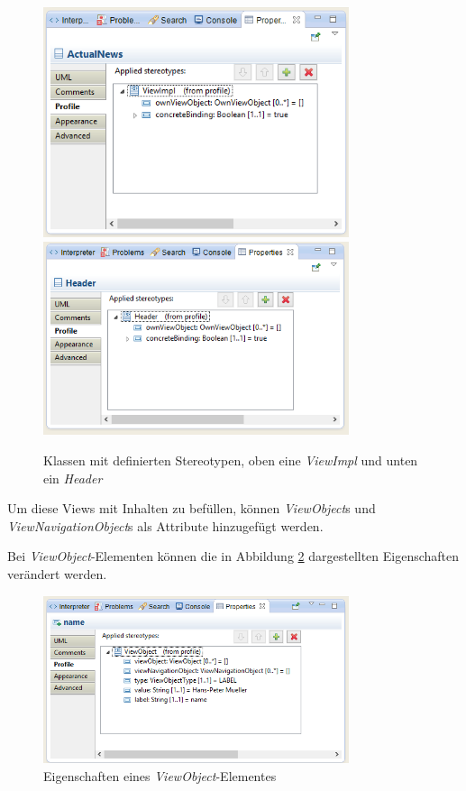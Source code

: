 \newpage
\begin{figure}[htbp]
\begin{center}
\includegraphics[width=0.8\textwidth]{./img/Prop-ViewImp.png}
\includegraphics[width=0.8\textwidth]{./img/Prop-Header.png}
\caption{Klassen mit definierten Stereotypen, oben
eine \textit{ViewImpl} und unten ein \textit{Header}}\label{Fig:SideProp}
\end{center}
\end{figure} 

Um diese Views mit Inhalten zu befüllen, können \textit{ViewObject}s und 
\textit{ViewNavigationObject}s als Attribute hinzugefügt werden.

\newpage
Bei \textit{ViewObject}-Elementen können die in Abbildung \ref{Fig:ViewProp}
dargestellten Eigenschaften verändert werden.

\begin{figure}[htbp]
\begin{center}
\includegraphics[width=0.8\textwidth]{./img/Prop-ViewObjects.png}
\caption{Eigenschaften eines \textit{ViewObject}-Elementes }\label{Fig:ViewProp}
\end{center}
\end{figure} 

